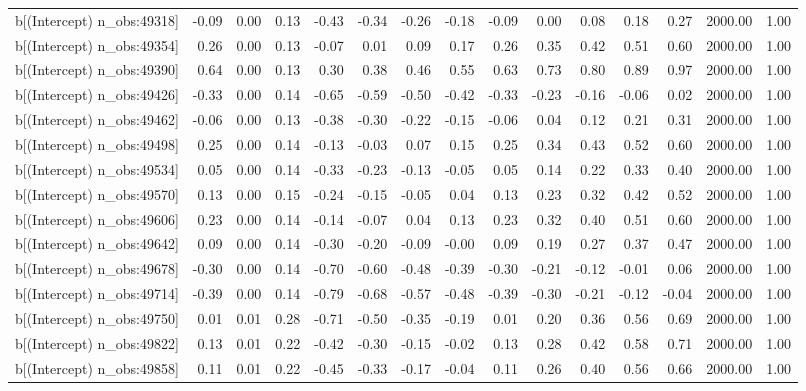 \begin{table}[ht]
\begin{tabular}{rrrrrrrrrrrrrrr}
  b[(Intercept) n\_obs:49318] & -0.09 & 0.00 & 0.13 & -0.43 & -0.34 & -0.26 & -0.18 & -0.09 & 0.00 & 0.08 & 0.18 & 0.27 & 2000.00 & 1.00 \\ 
  b[(Intercept) n\_obs:49354] & 0.26 & 0.00 & 0.13 & -0.07 & 0.01 & 0.09 & 0.17 & 0.26 & 0.35 & 0.42 & 0.51 & 0.60 & 2000.00 & 1.00 \\ 
  b[(Intercept) n\_obs:49390] & 0.64 & 0.00 & 0.13 & 0.30 & 0.38 & 0.46 & 0.55 & 0.63 & 0.73 & 0.80 & 0.89 & 0.97 & 2000.00 & 1.00 \\ 
  b[(Intercept) n\_obs:49426] & -0.33 & 0.00 & 0.14 & -0.65 & -0.59 & -0.50 & -0.42 & -0.33 & -0.23 & -0.16 & -0.06 & 0.02 & 2000.00 & 1.00 \\ 
  b[(Intercept) n\_obs:49462] & -0.06 & 0.00 & 0.13 & -0.38 & -0.30 & -0.22 & -0.15 & -0.06 & 0.04 & 0.12 & 0.21 & 0.31 & 2000.00 & 1.00 \\ 
  b[(Intercept) n\_obs:49498] & 0.25 & 0.00 & 0.14 & -0.13 & -0.03 & 0.07 & 0.15 & 0.25 & 0.34 & 0.43 & 0.52 & 0.60 & 2000.00 & 1.00 \\ 
  b[(Intercept) n\_obs:49534] & 0.05 & 0.00 & 0.14 & -0.33 & -0.23 & -0.13 & -0.05 & 0.05 & 0.14 & 0.22 & 0.33 & 0.40 & 2000.00 & 1.00 \\ 
  b[(Intercept) n\_obs:49570] & 0.13 & 0.00 & 0.15 & -0.24 & -0.15 & -0.05 & 0.04 & 0.13 & 0.23 & 0.32 & 0.42 & 0.52 & 2000.00 & 1.00 \\ 
  b[(Intercept) n\_obs:49606] & 0.23 & 0.00 & 0.14 & -0.14 & -0.07 & 0.04 & 0.13 & 0.23 & 0.32 & 0.40 & 0.51 & 0.60 & 2000.00 & 1.00 \\ 
  b[(Intercept) n\_obs:49642] & 0.09 & 0.00 & 0.14 & -0.30 & -0.20 & -0.09 & -0.00 & 0.09 & 0.19 & 0.27 & 0.37 & 0.47 & 2000.00 & 1.00 \\ 
  b[(Intercept) n\_obs:49678] & -0.30 & 0.00 & 0.14 & -0.70 & -0.60 & -0.48 & -0.39 & -0.30 & -0.21 & -0.12 & -0.01 & 0.06 & 2000.00 & 1.00 \\ 
  b[(Intercept) n\_obs:49714] & -0.39 & 0.00 & 0.14 & -0.79 & -0.68 & -0.57 & -0.48 & -0.39 & -0.30 & -0.21 & -0.12 & -0.04 & 2000.00 & 1.00 \\ 
  b[(Intercept) n\_obs:49750] & 0.01 & 0.01 & 0.28 & -0.71 & -0.50 & -0.35 & -0.19 & 0.01 & 0.20 & 0.36 & 0.56 & 0.69 & 2000.00 & 1.00 \\ 
  b[(Intercept) n\_obs:49822] & 0.13 & 0.01 & 0.22 & -0.42 & -0.30 & -0.15 & -0.02 & 0.13 & 0.28 & 0.42 & 0.58 & 0.71 & 2000.00 & 1.00 \\ 
  b[(Intercept) n\_obs:49858] & 0.11 & 0.01 & 0.22 & -0.45 & -0.33 & -0.17 & -0.04 & 0.11 & 0.26 & 0.40 & 0.56 & 0.66 & 2000.00 & 1.00 \\ 

\end{tabular}
\end{table}
